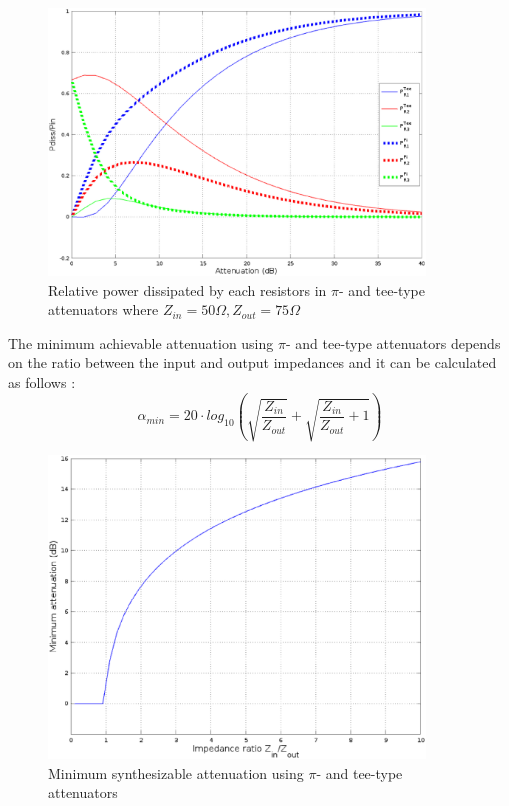 \begin{figure}[ht]
\begin{center}
\includegraphics[width=10cm]{Relative-dissipated-power-pi-tee-Zin-50-Zout-75}
\end{center}
\caption{Relative power dissipated by each resistors in $\pi$- and tee-type attenuators where $Z_{in} = 50\Omega, Z_{out} = 75 \Omega$}
\label{fig:tee_pi_pow_diss_Zin_50_Zout_75}
\end{figure}
\FloatBarrier

\noindent The minimum achievable attenuation using $\pi$- and tee-type attenuators depends on the ratio between the input and output impedances and it can be calculated as follows \cite{Vizmuller}:
\begin{equation}
\alpha_{min} = 20 \cdot log_{10} \left( \sqrt{\dfrac{Z_{in}}{Z_{out}}} + \sqrt{\dfrac{Z_{in}}{Z_{out}}+1}\right)
\end{equation}

\begin{figure}[ht]
\begin{center}
\includegraphics[width=10cm]{Minimum_Synthesizable_Att_Pi_Tee}
\end{center}
\caption{Minimum synthesizable attenuation using $\pi$- and tee-type attenuators}
\label{fig:tee_pi_min_att}
\end{figure}
\FloatBarrier

